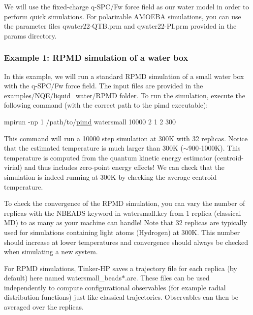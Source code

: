 We will use the fixed-\/charge q-\/\-S\-P\-C/\-Fw force field as our water model in order to perform quick simulations. For polarizable A\-M\-O\-E\-B\-A simulations, you can use the parameter files {\ttfamily qwater22-\/\-Q\-T\-B.\-prm} and {\ttfamily qwater22-\/\-P\-I.\-prm} provided in the {\ttfamily params} directory.

\subsubsection*{Example 1\-: R\-P\-M\-D simulation of a water box}

In this example, we will run a standard R\-P\-M\-D simulation of a small water box with the q-\/\-S\-P\-C/\-Fw force field. The input files are provided in the {\ttfamily examples/\-N\-Q\-E/liquid\-\_\-water/\-R\-P\-M\-D} folder. To run the simulation, execute the following command (with the correct path to the {\ttfamily pimd} executable)\-:


\begin{DoxyCode}
mpirun -np 1 /path/to/\hyperlink{pimd_8f90_afaefd022c8914d9e16a596dcd038638b}{pimd} watersmall 10000 2 1 2 300
\end{DoxyCode}


This command will run a 10000 step simulation at 300\-K with 32 replicas. Notice that the estimated temperature is much larger than 300\-K ($\sim$900-\/1000\-K). This temperature is computed from the quantum kinetic energy estimator (centroid-\/virial) and thus includes zero-\/point energy effects! We can check that the simulation is indeed running at 300\-K by checking the average centroid temperature.

To check the convergence of the R\-P\-M\-D simulation, you can vary the number of replicas with the {\ttfamily N\-B\-E\-A\-D\-S} keyword in {\ttfamily watersmall.\-key} from 1 replica (classical M\-D) to as many as your machine can handle! Note that 32 replicas are typically used for simulations containing light atoms (Hydrogen) at 300\-K. This number should increase at lower temperatures and convergence should always be checked when simulating a new system.

For R\-P\-M\-D simulations, Tinker-\/\-H\-P saves a trajectory file for each replica (by default) here named {\ttfamily watersmall\-\_\-beads$\ast$.arc}. These files can be used independently to compute configurational observables (for example radial distribution functions) just like classical trajectories. Observables can then be averaged over the replicas.

